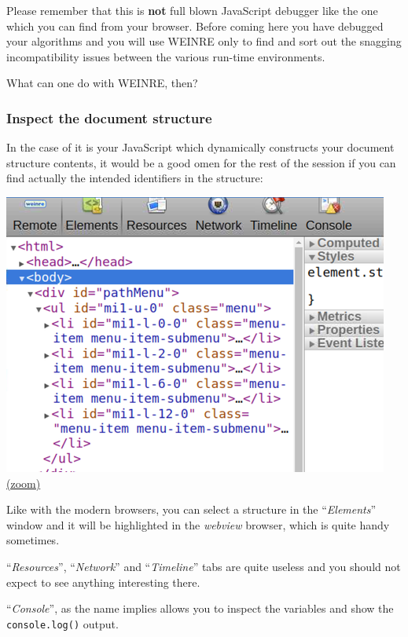 \documentclass[11pt]{article}
\begin{document}
    Please remember that this is \textbf{not} full blown JavaScript debugger
like the one which you can find from your browser. Before coming here
you have debugged your algorithms and you will use WEINRE only to find
and sort out the snagging incompatibility issues between the various
run-time environments.

    What can one do with WEINRE, then?

    \hypertarget{inspect-the-document-structure}{%
\subsubsection{Inspect the document
structure}\label{inspect-the-document-structure}}

    In the case of it is your JavaScript which dynamically constructs your
document structure contents, it would be a good omen for the rest of the
session if you can find actually the intended identifiers in the
structure:

    \includegraphics{2019-12-25_weinre_server_element_inspection.png}
\href{img/2019-12-25_weinre_server_element_inspection.png}{(zoom)}

    Like with the modern browsers, you can select a structure in the
``\emph{Elements}'' window and it will be highlighted in the
\emph{webview} browser, which is quite handy sometimes.

    ``\emph{Resources}'', ``\emph{Network}'' and ``\emph{Timeline}'' tabs
are quite useless and you should not expect to see anything interesting
there.

    ``\emph{Console}'', as the name implies allows you to inspect the
variables and show the \texttt{console.log()} output.
\end{document}
